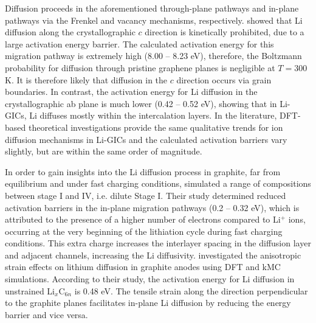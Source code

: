 \documentclass[../main.tex]{subfiles}
\begin{document}
Diffusion proceeds in the aforementioned through-plane pathways and in-plane pathways via the Frenkel and vacancy mechanisms, respectively. \citeauthor{thinius2014theoretical} showed that Li diffusion along the crystallographic $c$ direction is kinetically prohibited, due to a large activation energy barrier.\cite{thinius2014theoretical} The calculated activation energy for this migration pathway is extremely high (8.00 -- 8.23 eV), therefore, the Boltzmann probability for diffusion through pristine graphene planes is negligible at $T = 300$ K. It is therefore likely that diffusion in the $c$ direction occurs via grain boundaries. \cite{persson2010lithium} In contrast, the activation energy for Li diffusion in the crystallographic ab plane is much lower (0.42 -- 0.52 eV), showing that in Li-GICs, Li diffuses mostly within the intercalation layers.\cite{thinius2014theoretical} In the literature, DFT-based theoretical investigations provide the same qualitative trends for ion diffusion mechanisms in Li-GICs and the calculated activation barriers vary slightly, but are within the same order of magnitude.\cite{Imai-JAC-2007,persson2010lithium,toyoura2010effects,Wang} 

In order to gain insights into the Li diffusion process in graphite, far from equilibrium and under fast charging conditions, \citeauthor{Hakim} simulated a range of compositions between stage I and IV, i.e. dilute Stage I.\cite{Hakim} Their study determined reduced activation barriers in the in-plane migration pathways (0.2 -- 0.32 eV), which is attributed to the presence of a higher number of electrons compared to Li$^{+}$ ions, occurring at the very beginning of the lithiation cycle during fast charging conditions. This extra charge increases the interlayer spacing in the diffusion layer and adjacent channels, increasing the Li diffusivity.\cite{Hakim} \citeauthor{JI201866} investigated the anisotropic strain effects on lithium diffusion in graphite anodes using DFT and kMC simulations. \cite{JI201866} According to their study, the activation energy for Li diffusion in unstrained Li$_{x}$C$_{6n}$ is 0.48 eV. The tensile strain along the direction perpendicular to the graphite planes facilitates in-plane Li diffusion by reducing the energy barrier and vice versa.\cite{JI201866}
\end{document}
